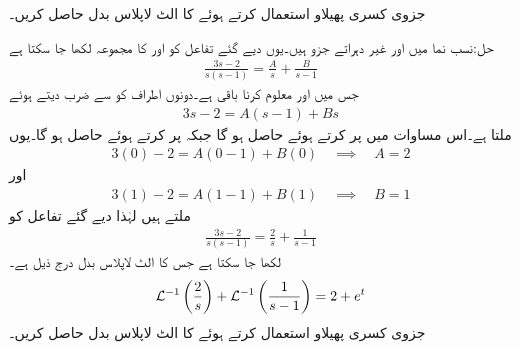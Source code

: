 جزوی کسری پھیلاو استعمال کرتے ہوئے  کا الٹ لاپلاس بدل حاصل کریں۔

حل:نسب نما میں  اور  غیر دہراتے جزو ہیں۔یوں دیے گئے تفاعل کو  اور  کا مجموعہ لکھا جا سکتا ہے
\begin{align*}
\frac{3s-2}{s(s-1)}=\frac{A}{s}+\frac{B}{s-1}
\end{align*}
جس میں  اور  معلوم کرنا باقی ہے۔دونوں اطراف کو  سے ضرب دیتے ہوئے
\begin{align*}
3s-2=A(s-1)+Bs
\end{align*}
ملتا ہے۔اس مساوات میں  پر کرتے ہوئے  حاصل ہو گا جبکہ  پر کرتے ہوئے  حاصل ہو گا۔یوں
\begin{align*}
3(0)-2=A(0-1)+B(0)\quad \implies \quad A=2
\end{align*} 
اور
\begin{align*}
3(1)-2=A(1-1)+B(1)\quad \implies \quad B=1
\end{align*}
ملتے ہیں لہٰذا دیے گئے تفاعل کو
\begin{align*}
\frac{3s-2}{s(s-1)}=\frac{2}{s}+\frac{1}{s-1}
\end{align*}
لکھا جا سکتا ہے جس کا الٹ لاپلاس بدل درج ذیل ہے۔
\begin{align*}
\mathcal{L}^{-1}\left(\frac{2}{s}\right)+\mathcal{L}^{-1}\left(\frac{1}{s-1}\right)=2+e^t
\end{align*}
جزوی کسری پھیلاو استعمال کرتے ہوئے  کا الٹ لاپلاس بدل حاصل کریں۔

